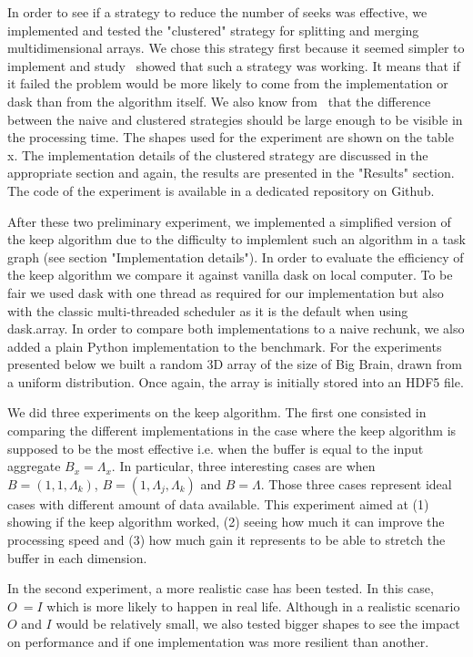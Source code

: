 \documentclass[conference]{IEEEtran}
\begin{document}
In order to see if a strategy to reduce the number of seeks was effective, we
implemented and tested the "clustered" strategy for splitting and merging
multidimensional arrays. We chose this strategy first because it seemed simpler
to implement and study~\cite{seqalgorithms} showed that such a strategy was
working. It means that if it failed the problem would be more likely to come
from the implementation or dask than from the algorithm itself. We also know
from~\cite{seqalgorithms} that the difference between the naive and clustered
strategies should be large enough to be visible in the processing time. The
shapes used for the experiment are shown on the table x. The implementation
details of the clustered strategy are discussed in the appropriate section and
again, the results are presented in the "Results" section. The code of the
experiment is available in a dedicated repository on Github.

After these two preliminary experiment, we implemented a simplified version of
the keep algorithm due to the difficulty to implemlent such an algorithm in a
task graph (see section "Implementation details"). In order to evaluate the
efficiency of the keep algorithm we compare it against vanilla dask on local
computer. To be fair we used dask with one thread as required for our
implementation but also with the classic multi-threaded  scheduler as it is the
default when using dask.array. In order to compare both implementations to a
naive rechunk, we also added a plain Python implementation to the benchmark. For
the experiments presented below we built a random 3D array of the size of Big
Brain, drawn from a uniform distribution. Once again, the array is initially
stored into an HDF5 file.

We did three experiments on the keep algorithm. The first one consisted in
comparing the different implementations in the case where the keep algorithm is
supposed to be the most effective i.e. when the buffer is equal to the input
aggregate $B_x=\Lambda_x$. In particular, three interesting cases are when
$B=(1,1,\Lambda_k)$, $B=(1,\Lambda_j, \Lambda_k)$ and $B=\Lambda$. Those three
cases represent ideal cases with different amount of data available. This
experiment aimed at (1) showing if the keep algorithm worked, (2) seeing how much it
can improve the processing speed and (3) how much gain it represents to be able to
stretch the buffer in each dimension.

In the second experiment, a more realistic case has been tested. In this case,
$O~=I$ which is more likely to happen in real life. Although in a realistic
scenario $O$ and $I$ would be relatively small, we also tested bigger shapes to
see the impact on performance and if one implementation was more resilient than
another.
\end{document}

